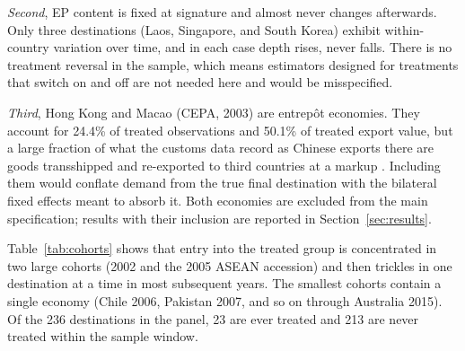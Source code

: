 \documentclass[12pt]{article}
\begin{document}
\emph{Second}, EP content is fixed at signature and almost never changes afterwards. Only
three destinations (Laos, Singapore, and South Korea) exhibit within-country variation
over time, and in each case depth rises, never falls. There is no treatment reversal
in the sample, which means estimators designed for treatments that switch on and off are
not needed here and would be misspecified.

\emph{Third}, Hong Kong and Macao (CEPA, 2003) are entrepôt economies. They account for
24.4\% of treated observations and 50.1\% of treated export value, but a large fraction
of what the customs data record as Chinese exports there are goods transshipped and
re-exported to third countries at a markup \citep{feenstra2004}. Including them would
conflate demand from the true final destination with the bilateral fixed effects meant to
absorb it. Both economies are excluded from the main specification; results with their
inclusion are reported in Section~\ref{sec:results}.

Table~\ref{tab:cohorts} shows that entry into the treated group is concentrated in two
large cohorts (2002 and the 2005 ASEAN accession) and then trickles in one destination
at a time in most subsequent years. The smallest cohorts contain a single economy
(Chile 2006, Pakistan 2007, and so on through Australia 2015). Of the 236 destinations
in the panel, 23 are ever treated and 213 are never treated within the sample window.
\end{document}
